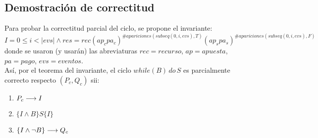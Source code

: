 \documentclass[10pt,a4paper]{article}
\begin{document}




\subsection{Demostración de correctitud}

Para probar la correctitud parcial del ciclo, se propone el invariante:
\begin{equation}
	I = 0 \leq i < |evs| \wedge res = rec (ap_c pa_c)^{\# apariciones(subseq(0, i, evs), T)}(ap_s pa_s)^{\#apariciones(subseq(0, i, evs), F)}
\end{equation}	
donde se usaron (y usarán) las abreviaturas $rec = recurso$, $ap = apuesta$, $pa = pago$, $evs = eventos$.\\

Así, por el teorema del invariante, el ciclo $while(B) \, do \, S$ es parcialmente correcto respecto $(P_c, Q_c) $ sii:

\begin{enumerate} \setlength\itemsep{0cm}
	\item $P_c \longrightarrow I$
	\item $\{I \wedge B \} S \{I\}$
	\item $\{I \wedge \neg B \} \longrightarrow Q_c$
\end{enumerate}
\end{document}
